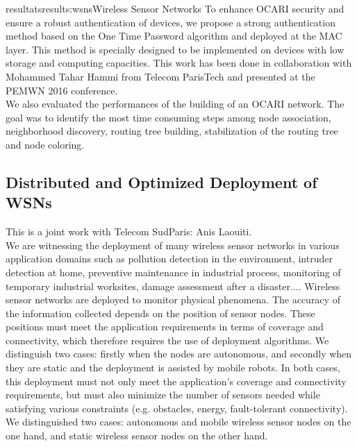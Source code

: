 \documentclass{ra2016}
\begin{document}
\begin{module}{resultats}{results:wsns}{Wireless Sensor Networks}
To enhance OCARI security and ensure a robust
authentication of devices, we propose a strong authentication
method based on the One Time Password algorithm and deployed
at the MAC layer. This method is specially designed to
be implemented on devices with low storage and computing
capacities.
This work has been done in collaboration with Mohammed Tahar Hammi from Telecom ParisTech and presented at the PEMWN 2016 conference.\\

We also evaluated the performances of the building of an OCARI network. The goal was to identify the most time consuming steps among node association, neighborhood discovery, routing tree building, stabilization of the routing tree and node coloring.\\




\subsection{Distributed and Optimized Deployment of WSNs}

\begin{participants}
\end{participants}

This is a joint work with Telecom SudParis: Anis Laouiti.\\

We are witnessing the deployment of many wireless sensor networks in various application domains such as pollution detection in the environment, intruder detection at home, preventive maintenance in industrial process, monitoring of temporary industrial worksites, damage assessment after a disaster.... Wireless sensor networks are deployed to monitor physical phenomena. The accuracy
of the information collected depends on the position of sensor nodes. These positions must
meet the application requirements in terms of coverage and connectivity, which therefore
requires the use of deployment algorithms. We distinguish two cases: firstly when the nodes
are autonomous, and secondly when they are static and the deployment is assisted by
mobile robots. In both cases, this deployment must not only meet the application's coverage
and connectivity requirements, but must also minimize the number of sensors needed
while satisfying various constraints (e.g. obstacles, energy, fault-tolerant connectivity).
We distinguished two cases: autonomous and mobile wireless sensor nodes on the one hand, and static wireless sensor nodes on the other hand.


\end{module}
\end{document}
